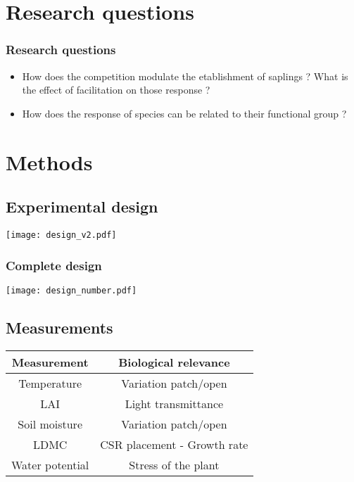 \documentclass{beamer}[12pt]
\begin{document}
\section{Research questions}

\begin{frame}\frametitle{Research questions}
	\begin{itemize}
		\item How does the competition modulate the etablishment of saplings ? What is the effect of facilitation on those response ?
		\item How does the response of species can be related to their functional group ?
	\end{itemize}
\end{frame}
\section{Methods}

\subsection{Experimental design}

\begin{frame}
	\texttt{[image: design\_v2.pdf]}
\end{frame}

\begin{frame}\frametitle{Complete design}
	\texttt{[image: design\_number.pdf]}
\end{frame}

\subsection{Measurements}

\begin{frame}
	\begin{table}

		\begin{center}

			\begin{tabular}{cc}
Measurement & Biological relevance\\
\hline
Temperature & Variation patch/open\\
LAI & Light transmittance\\
Soil moisture & Variation patch/open\\
LDMC & CSR placement - Growth rate\\
Water potential & Stress of the plant\\
\hline 

\end{tabular}
\end{center}
\end{table}
\end{frame}
\end{document}
